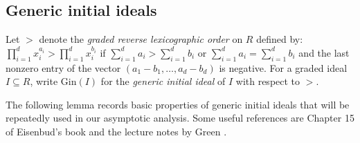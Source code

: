 \documentclass[12pt,a4paper]{amsart}
\theoremstyle{plain}
\theoremstyle{definition}
\numberwithin{equation}{theorem}
\begin{document}
\subsection{Generic initial ideals}
Let $>$ denote the \emph{graded reverse lexicographic order} on $R$ defined by: $\prod_{i=1}^d x_i^{a_i} > \prod_{i=1}^d x_i^{b_i}$ if $\sum_{i=1}^d a_i > \sum_{i=1}^d b_i$ or $\sum_{i=1}^d a_i = \sum_{i=1}^d b_i$ and the last nonzero entry of the vector $(a_1-b_1,\ldots,a_d-b_d)$ is negative. For a graded ideal $I \subseteq R$, write $\mathrm{Gin}(I)$ for the \emph{generic initial ideal} of $I$ with respect to $>$.

The following lemma records basic properties of generic initial ideals that will be repeatedly used in our asymptotic analysis. Some useful references are Chapter 15 of Eisenbud's book \cite{eisenbud} and the lecture notes by Green \cite{Gre98}.
\end{document}

